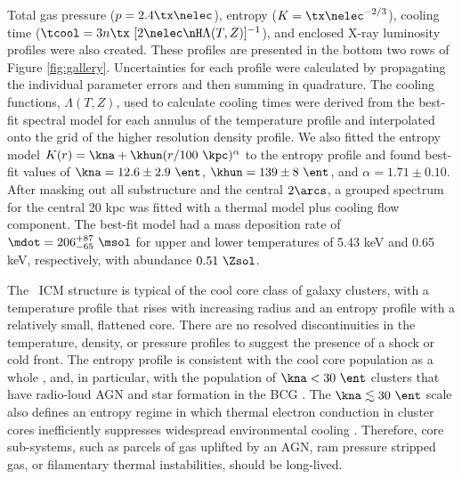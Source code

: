 \documentclass[useAMS,usenatbib]{mn2e}
\begin{document}
Total gas pressure ($p = 2.4 \tx \nelec$), entropy ($K =
\tx\nelec^{-2/3}$), cooling time ($\tcool = 3n\tx~[2\nelec \nH
  \Lambda(T,Z)]^{-1}$), and enclosed X-ray luminosity profiles were
also created. These profiles are presented in the bottom two rows of
Figure \ref{fig:gallery}. Uncertainties for each profile were
calculated by propagating the individual parameter errors and then
summing in quadrature. The cooling functions, $\Lambda(T,Z)$, used to
calculate cooling times were derived from the best-fit spectral model
for each annulus of the temperature profile and interpolated onto the
grid of the higher resolution density profile. We also fitted the
entropy model $K(r) = \kna +\khun (r/100 ~\kpc)^{\alpha}$ to the
entropy profile and found best-fit values of $\kna = 12.6 \pm 2.9
~\ent$, $\khun = 139 \pm 8 ~\ent$, and $\alpha = 1.71 \pm 0.10$.
After masking out all substructure and the central $2\arcs$, a grouped
spectrum for the central 20 kpc was fitted with a thermal model plus
cooling flow component. The best-fit model had a mass deposition rate
of $\mdot = 206^{+87}_{-65} ~\msol$ for upper and lower temperatures
of 5.43 keV and 0.65 keV, respectively, with abundance $0.51 ~\Zsol$.

The \rxj\ ICM structure is typical of the cool core class of galaxy
clusters, with a temperature profile that rises with increasing radius
and an entropy profile with a relatively small, flattened core. There
are no resolved discontinuities in the temperature, density, or
pressure profiles to suggest the presence of a shock or cold front.
The entropy profile is consistent with the cool core population as a
whole \citep{accept}, and, in particular, with the population of $\kna
< 30 ~\ent$ clusters that have radio-loud AGN and star formation in
the BCG \citep{haradent}. The $\kna \la 30 ~\ent$ scale also defines
an entropy regime in which thermal electron conduction in cluster
cores inefficiently suppresses widespread environmental cooling
\citep{conduction}. Therefore, core sub-systems, such as parcels of
gas uplifted by an AGN, ram pressure stripped gas, or filamentary
thermal instabilities, should be long-lived.
\end{document}
